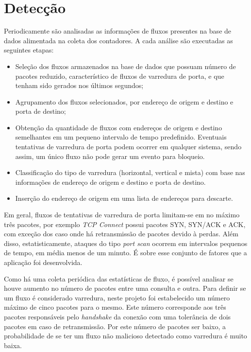 \section{Detecção}
\label{sec:deteccao}


Periodicamente são analisadas as informações de fluxos presentes na base de dados alimentada na coleta dos contadores. A cada análise são executadas as seguintes etapas:

\begin{itemize}
    \item Seleção dos fluxos armazenados na base de dados que possuam número de pacotes reduzido, característico de fluxos de varredura de porta, e que tenham sido gerados nos últimos segundos;
    \item Agrupamento dos fluxos selecionados, por endereço de origem e destino e porta de destino;
    \item Obtenção da quantidade de fluxos com endereços de origem e destino semelhantes em um pequeno intervalo de tempo predefinido. Eventuais tentativas de varredura de porta podem ocorrer em qualquer sistema, sendo assim, um único fluxo não pode gerar um evento para bloqueio.
    \item Classificação do tipo de varredura (horizontal, vertical e mista) com base nas informações de endereço de origem e destino e porta de destino.
    \item Inserção do endereço de origem em uma lista de endereços para descarte.
\end{itemize}

Em geral, fluxos de tentativas de varredura de porta limitam-se em no máximo três pacotes, por exemplo \textit{TCP Connect} possui pacotes SYN, SYN/ACK e ACK, com exceção dos caso onde há retransmissão de pacotes devido à perdas. Além disso, estatisticamente, ataques do tipo \textit{port scan} ocorrem em intervalos pequenos de tempo, em média menos de um minuto. É sobre esse conjunto de fatores que a aplicação foi desenvolvida.

Como há uma coleta periódica das estatísticas de fluxo, é possível analisar se houve aumento no número de pacotes entre uma consulta e outra. Para definir se um fluxo é considerado varredura, neste projeto foi estabelecido um número máximo de cinco pacotes para o mesmo. Este número corresponde aos três pacotes responsáveis pelo \textit{handshake} da conexão com uma tolerância de dois pacotes em caso de retransmissão. Por este número de pacotes ser baixo, a probabilidade de se ter um fluxo não malicioso detectado como varredura é muito baixa.

